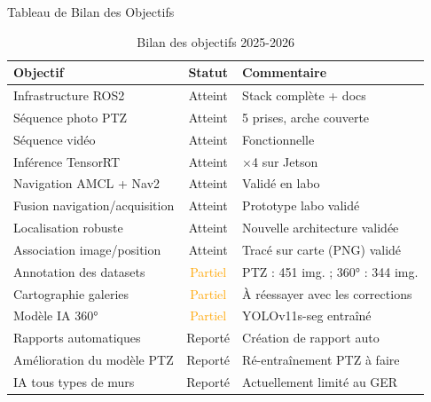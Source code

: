 \documentclass[aspectratio=169]{beamer}
\begin{document}
\begin{frame}{Tableau de Bilan des Objectifs}
    \begin{table}
        \centering
        \small
        \begin{tabular}{|p{5cm}|c|p{5.5cm}|}
            \hline
            \textbf{Objectif} & \textbf{Statut} & \textbf{Commentaire} \\
            \hline
            Infrastructure ROS2 & \textcolor{green!60!black}{Atteint} & Stack complète + docs \\
            \hline
            Séquence photo PTZ & \textcolor{green!60!black}{Atteint} & 5 prises, arche couverte \\
            \hline
            Séquence vidéo & \textcolor{green!60!black}{Atteint} & Fonctionnelle \\
            \hline
            Inférence TensorRT & \textcolor{green!60!black}{Atteint} & $\times$4 sur Jetson \\
            \hline
            Navigation AMCL + Nav2 & \textcolor{green!60!black}{Atteint} & Validé en labo \\
            \hline
            Fusion navigation/acquisition & \textcolor{green!60!black}{Atteint} & Prototype labo validé \\
            \hline
            Localisation robuste & \textcolor{green!60!black}{Atteint} & Nouvelle architecture validée \\
            \hline
            Association image/position & \textcolor{green!60!black}{Atteint} & Tracé sur carte (PNG) validé \\
            \hline
            Annotation des datasets & \textcolor{orange}{Partiel} & PTZ : 451 img. ; 360° : 344 img. \\
            \hline
            Cartographie galeries & \textcolor{orange}{Partiel} & À réessayer avec les corrections \\
            \hline
            Modèle IA 360° & \textcolor{orange}{Partiel} & YOLOv11s-seg entraîné \\
            \hline
            Rapports automatiques & \textcolor{red!70!black}{Reporté} & Création de rapport auto \\
            \hline
            Amélioration du modèle PTZ & \textcolor{red!70!black}{Reporté} & Ré-entraînement PTZ à faire \\
            \hline
            IA tous types de murs & \textcolor{red!70!black}{Reporté} & Actuellement limité au GER \\
            \hline
        \end{tabular}
        \caption{Bilan des objectifs 2025-2026}
    \end{table}
\end{frame}
\end{document}
